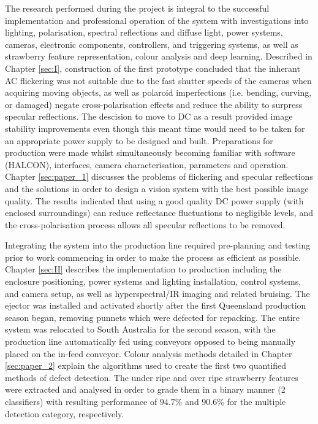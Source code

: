 \documentclass[fleqn,twoside,12pt]{report}
\begin{document}
The research performed during the project is integral to the successful implementation and professional operation of the system with investigations into lighting, polarisation, spectral reflections and diffuse light, power systems, cameras, electronic components, controllers, and triggering systems, as well as strawberry feature representation, colour analysis and deep learning. Described in Chapter \ref{sec:I}, construction of the first prototype concluded that the inherant AC flickering was not suitable due to the fast shutter speeds of the cameras when acquiring moving objects, as well as polaroid imperfections (i.e. bending, curving, or damaged) negate cross-polarisation effects and reduce the ability to surpress specular reflections. The descision to move to DC as a result provided image stability improvements even though this meant time would need to be taken for an appropriate power supply to be designed and built. Preparations for production were made whilst simultaneously becoming familiar with software (HALCON\texttrademark), interfaces, camera characterisation, parameters and operation. Chapter \ref{sec:paper_1} discusses the problems of flickering and specular reflections and the solutions in order to design a vision system with the best possible image quality. The results indicated that using a good quality DC power supply (with enclosed surroundings) can reduce reflectance fluctuations to negligible levels, and the cross-polarisation process allows all specular reflections to be removed. 

Integrating the system into the production line required pre-planning and testing prior to work commencing in order to make the process as efficient as possible. Chapter \ref{sec:II} describes the implementation to production including the enclosure positioning, power systems and lighting installation, control systems, and camera setup, as well as hyperspectral/IR imaging and related bruising. The ejector was installed and activated shortly after the first Queensland production season began, removing punnets which were defected for repacking. The entire system was relocated to South Australia for the second season, with the production line automatically fed using conveyors opposed to being manually placed on the in-feed conveyor. Colour analysis methods detailed in Chapter \ref{sec:paper_2} explain the algorithms used to create the first two quantified methods of defect detection. The under ripe and over ripe strawberry features were extracted and analysed in order to grade them in a binary manner (2 classifiers) with resulting performance of $94.7\%$ and $90.6\%$ for the multiple detection category, respectively.
\end{document}
